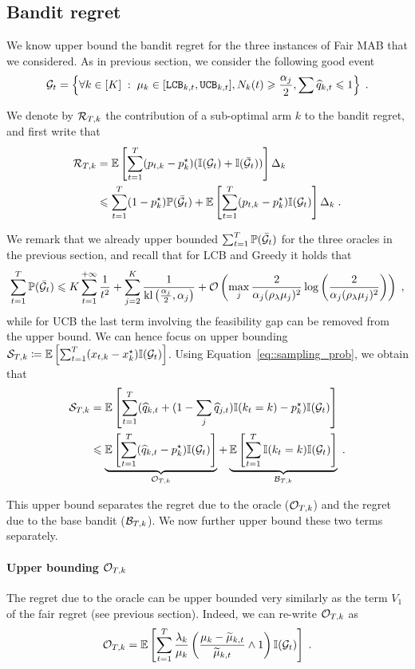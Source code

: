 \subsection{Bandit regret}

We know upper bound the bandit regret for the three instances of Fair MAB that we considered. As in previous section, we consider the following good event
 \[\mathcal{G}_t=\left\{ \forall k \in [K]\;:\; \mu_k \in [\texttt{LCB}_{k, t}, \texttt{UCB}_{k, t}], N_k(t)\geqslant \frac{\alpha_j}{2}, \sum \widehat{q}_{k,t} \leqslant 1 \right\}\;.\]

We denote by $\mathcal{R}_{T,k}$ the contribution of a sub-optimal arm $k$ to the bandit regret, and first write that 
\begin{align*}
\mathcal{R}_{T,k} &= \mathbb{E}\left[\sum_{t=1}^T (p_{t, k} - p^\star_k)(\mathbb{I}(\mathcal{G}_t)+\mathbb{I}(\bar {\mathcal{G}}_t))\right]\Delta_k \\
& \leqslant \sum_{t=1}^T (1-p_k^\star) \mathbb{P}(\bar {\mathcal{G}}_t) + \mathbb{E}\left[\sum_{t=1}^T (p_{t,k} - p_k^\star)\mathbb{I}(\mathcal{G}_t)\right] \Delta_k \;.
\end{align*}

We remark that we already upper bounded $\sum_{t=1}^T \mathbb{P}(\bar {\mathcal{G}}_t)$ for the three oracles in the previous section, and recall that for LCB and Greedy it holds that
\[\sum_{t=1}^T \mathbb{P}(\bar {\mathcal{G}}_t) \leqslant K \sum_{t=1}^{+\infty} \frac{1}{t^2} + \sum_{j=2}^K\frac{1}{\text{\normalfont kl}\left(\frac{\alpha_j}{2}, \alpha_j\right)} + \mathcal{O}\left(\max_j\frac{2}{\alpha_j(\rho_\lambda \mu_j)^2}\log\left(\frac{2}{\alpha_j(\rho_\lambda \mu_j)^2}\right)\right)\;, \]
while for UCB the last term involving the feasibility gap can be removed from the upper bound. We can hence focus on upper bounding $\mathcal{S}_{T, k} \coloneqq \mathbb{E}\left[\sum_{t=1}^T (x_{t,k} - x_k^\star)\mathbb{I}(\mathcal{G}_t)\right]$. Using Equation~\eqref{eq::sampling_prob}, we obtain that 
\begin{align*}\mathcal{S}_{T,k} &= \mathbb{E}\left[\sum_{t=1}^T (\widehat{q}_{k, t} + (1-\sum_j \widehat{q}_{j, t}) \mathbb{I}(k_t=k) - p_k^\star)\mathbb{I}(\mathcal{G}_t)\right] \\
& \leqslant   \underbrace{\mathbb{E}\left[\sum_{t=1}^T (\widehat{q}_{k, t}-p_k^\star) \mathbb{I}(\mathcal{G}_t)\right]}_{\mathcal{O}_{ T,k}} + \underbrace{\mathbb{E}\left[\sum_{t=1}^T \mathbb{I}(k_t=k)\mathbb{I}(\mathcal{G}_t)\right]}_{\mathcal{B}_{T,k}} \;.
\end{align*}

This upper bound separates the regret due to the oracle ($\mathcal{O}_{T,k}$) and the regret due to the base bandit ($\mathcal{B}_{T,k}$). We now further upper bound these two terms separately.

\paragraph{Upper bounding $\mathcal{O}_{T, k}$} The regret due to the oracle can be upper bounded very similarly as the term $V_1$ of the fair regret (see previous section). Indeed, we can re-write $\mathcal{O}_{T,k}$ as 
\[\mathcal{O}_{T,k} =\mathbb{E}\left[\sum_{t=1}^T \frac{\lambda_k}{\mu_k}\left(\frac{\mu_k-\widetilde{\mu}_{k, t}}{\widetilde{\mu}_{k, t}} \wedge 1 \right) \mathbb{I}(\mathcal{G}_t)\right] \;.  \]

